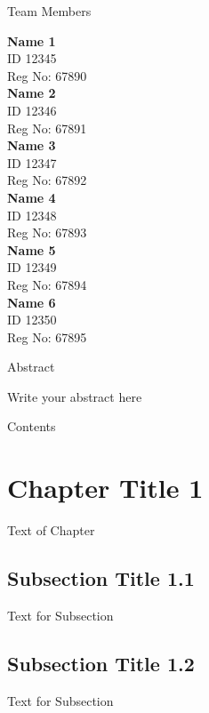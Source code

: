 \documentclass[12pt]{article}
\begin{document}
\begin{titlepage}
\begin{center}
    {\Huge Team Members}
\end{center}
\begin{multicols}{2}
    \textbf{Name 1} \\ ID 12345 \\ Reg No: 67890 \\[1cm]
    \textbf{Name 2} \\ ID 12346 \\ Reg No: 67891 \\[1cm]
    \textbf{Name 3} \\ ID 12347 \\ Reg No: 67892 \\[1cm]
    \textbf{Name 4} \\ ID 12348 \\ Reg No: 67893 \\[1cm]
    \textbf{Name 5} \\ ID 12349 \\ Reg No: 67894 \\[1cm]
    \textbf{Name 6} \\ ID 12350 \\ Reg No: 67895
\end{multicols}
\end{titlepage}

\newpage
\begin{center}
    {\Huge Abstract}
\end{center}
\noindent
Write your abstract here

\newpage
\begin{center}
    {\Huge Contents}
\end{center}
\tableofcontents

\newpage

\section{Chapter Title 1}
\noindent
Text of Chapter 

\subsection{Subsection Title 1.1}
\noindent
Text for Subsection 

\subsection{Subsection Title 1.2}
\noindent
Text for Subsection 
\end{document}
